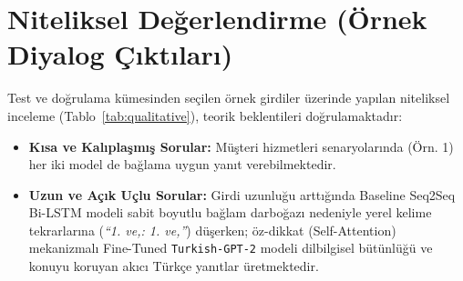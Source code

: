 \documentclass[conference]{IEEEtran}
\begin{document}
\section{Niteliksel Değerlendirme (Örnek Diyalog Çıktıları)}
Test ve doğrulama kümesinden seçilen örnek girdiler üzerinde yapılan niteliksel inceleme (Tablo~\ref{tab:qualitative}), teorik beklentileri doğrulamaktadır:
\begin{itemize}
    \item \textbf{Kısa ve Kalıplaşmış Sorular:} Müşteri hizmetleri senaryolarında (Örn. 1) her iki model de bağlama uygun yanıt verebilmektedir.
    \item \textbf{Uzun ve Açık Uçlu Sorular:} Girdi uzunluğu arttığında Baseline Seq2Seq Bi-LSTM modeli sabit boyutlu bağlam darboğazı nedeniyle yerel kelime tekrarlarına (\textit{``1. ve,: 1. ve,''}) düşerken; öz-dikkat (Self-Attention) mekanizmalı Fine-Tuned \texttt{Turkish-GPT-2} modeli dilbilgisel bütünlüğü ve konuyu koruyan akıcı Türkçe yanıtlar üretmektedir.
\end{itemize}
\end{document}
